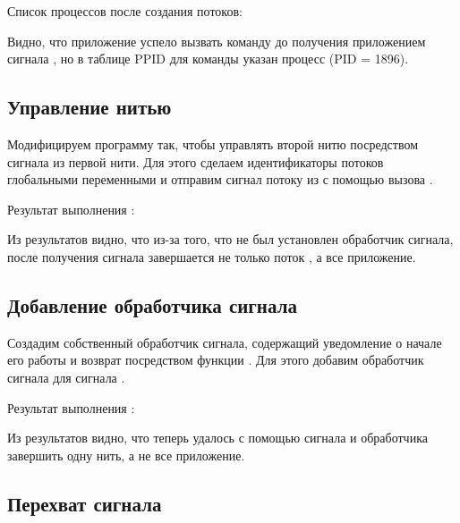 Список процессов после создания потоков:



Видно, что приложение успело вызвать команду  до получения приложением сигнала , но в таблице PPID для команды  указан процесс  (PID = 1896).

\subsection{Управление нитью}

Модифицируем программу так, чтобы управлять второй нитю посредством сигнала  из первой нити. Для этого сделаем идентификаторы потоков глобальными переменными и отправим сигнал потоку  из  с помощью вызова .



Результат выполнения :



Из результатов видно, что из-за того, что не был установлен обработчик сигнала, после получения сигнала завершается не только поток , а все приложение.

\subsection{Добавление обработчика сигнала}

Создадим собственный обработчик сигнала, содержащий уведомление о начале его работы и возврат посредством функции . Для этого добавим обработчик сигнала  для сигнала .



Результат выполнения :



Из результатов видно, что теперь удалось с помощью сигнала и обработчика завершить одну нить, а не все приложение. 

\subsection{Перехват сигнала }

